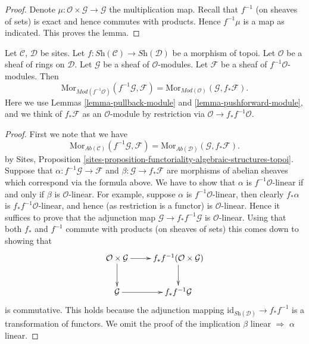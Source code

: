 \begin{proof}
Denote $\mu : \mathcal{O} \times \mathcal{G} \to \mathcal{G}$ the
multiplication map. Recall that $f^{-1}$ (on sheaves of sets) is exact
and hence commutes with products. Hence $f^{-1}\mu$ is a map as
indicated. This proves the lemma.
\end{proof}

\begin{lemma}
\label{lemma-adjoint-push-pull-modules}
Let $\mathcal{C}$, $\mathcal{D}$ be sites.
Let $f : \textit{Sh}(\mathcal{C}) \to \textit{Sh}(\mathcal{D})$
be a morphism of topoi.
Let $\mathcal{O}$ be a sheaf of rings on $\mathcal{D}$.
Let $\mathcal{G}$ be a sheaf of $\mathcal{O}$-modules.
Let $\mathcal{F}$ be a sheaf of $f^{-1}\mathcal{O}$-modules.
Then
$$
\text{Mor}_{\textit{Mod}(f^{-1}\mathcal{O})}(f^{-1}\mathcal{G}, \mathcal{F})
=
\text{Mor}_{\textit{Mod}(\mathcal{O})}(\mathcal{G}, f_*\mathcal{F}).
$$
Here we use
Lemmas \ref{lemma-pullback-module}
and \ref{lemma-pushforward-module}, and we think of
$f_*\mathcal{F}$ as an $\mathcal{O}$-module by restriction via
$\mathcal{O} \to f_*f^{-1}\mathcal{O}$.
\end{lemma}

\begin{proof}
First we note that we have
$$
\text{Mor}_{\textit{Ab}(\mathcal{C})}(f^{-1}\mathcal{G}, \mathcal{F})
=
\text{Mor}_{\textit{Ab}(\mathcal{D})}(\mathcal{G}, f_*\mathcal{F}).
$$
by Sites,
Proposition \ref{sites-proposition-functoriality-algebraic-structures-topoi}.
Suppose that $\alpha : f^{-1}\mathcal{G} \to \mathcal{F}$ and
$\beta : \mathcal{G} \to f_*\mathcal{F}$ are morphisms of abelian
sheaves which correspond via the formula above. We have to show that
$\alpha$ is $f^{-1}\mathcal{O}$-linear if and only if $\beta$
is $\mathcal{O}$-linear. For example, suppose $\alpha$ is
$f^{-1}\mathcal{O}$-linear, then clearly $f_*\alpha$ is
$f_*f^{-1}\mathcal{O}$-linear, and hence (as restriction is a functor)
is $\mathcal{O}$-linear. Hence it suffices to prove that the
adjunction map $\mathcal{G} \to f_*f^{-1}\mathcal{G}$ is
$\mathcal{O}$-linear. Using that both $f_*$ and $f^{-1}$ commute
with products (on sheaves of sets) this comes down to showing that
$$
\xymatrix{
\mathcal{O} \times \mathcal{G} \ar[r] \ar[d] &
f_*f^{-1}(\mathcal{O} \times \mathcal{G}) \ar[d] \\
\mathcal{G} \ar[r] & f_*f^{-1}\mathcal{G}
}
$$
is commutative. This holds because the adjunction mapping
$\text{id}_{\textit{Sh}(\mathcal{D})} \to f_*f^{-1}$ is a
transformation of functors. We omit the proof of the implication
$\beta$ linear $\Rightarrow$ $\alpha$ linear.
\end{proof}


